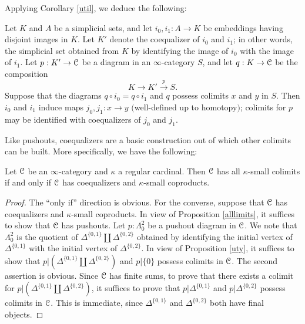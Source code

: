 Applying Corollary \ref{util}, we deduce the following:

\begin{proposition}\label{uty}
Let $K$ and $A$ be a simplicial sets, and let $i_0, i_1: A \rightarrow K$ be embeddings having disjoint images in $K$. Let $K'$ denote the coequalizer of $i_0$ and $i_1$; in other words, the simplicial set obtained from $K$ by identifying the image of $i_0$ with the image of $i_1$.
Let $p: K' \rightarrow \operatorname{\mathcal{C}}$ be a diagram in an $\infty$-category $S$, and let $q: K \rightarrow \operatorname{\mathcal{C}}$
be the composition
$$ K \rightarrow K' \stackrel{p}{\rightarrow} S.$$
Suppose that the diagrams $q \circ i_0= q \circ i_1$ and $q$ possess colimits $x$ and $y$ in $S$. 
Then $i_0$ and $i_1$ induce maps $j_0, j_1: x \rightarrow y$ $($well-defined up to homotopy$)$; 
colimits for $p$ may be identified with coequalizers of $j_0$ and $j_1$.
\end{proposition}

Like pushouts, coequalizers are a basic construction out of which other colimits can be built.
More specifically, we have the following:

\begin{proposition}\label{appendixdiagram}
Let $\operatorname{\mathcal{C}}$ be an $\infty$-category and $\kappa$ a regular cardinal. Then $\operatorname{\mathcal{C}}$ has all $\kappa$-small colimits if and only if $\operatorname{\mathcal{C}}$ has coequalizers and $\kappa$-small coproducts.
\end{proposition}

\begin{proof}
The ``only if'' direction is obvious. For the converse, suppose that $\operatorname{\mathcal{C}}$ has coequalizers and $\kappa$-small coproducts. In view of Proposition \ref{alllimits}, it suffices to show that $\operatorname{\mathcal{C}}$ has pushouts.
Let $p: \Lambda^2_0$ be a pushout diagram in $\operatorname{\mathcal{C}}$. We note that $\Lambda^2_0$ is the quotient of $\Delta^{ \{0,1\} } \coprod \Delta^{ \{0,2\} }$ obtained by identifying the initial vertex of $\Delta^{ \{0,1\} }$ with the initial vertex of $\Delta^{ \{0,2\} }$. In view of Proposition \ref{uty}, it suffices to show that $p| ( \Delta^{ \{0,1\} } \coprod \Delta^{ \{0,2\} } )$ and $p| \{0\}$ possess colimits in $\operatorname{\mathcal{C}}$. The second assertion is obvious. Since $\operatorname{\mathcal{C}}$ has finite sums, to prove that there exists a colimit for
$p| ( \Delta^{ \{0,1\} } \coprod \Delta^{ \{0,2\} } )$, it suffices to prove that $p| \Delta^{ \{0,1\}}$ and
$p|\Delta^{ \{0,2\} }$ possess colimits in $\operatorname{\mathcal{C}}$. This is immediate, since $\Delta^{ \{0,1\} }$ and $\Delta^{ \{0,2\} }$ both have final objects.
\end{proof}

